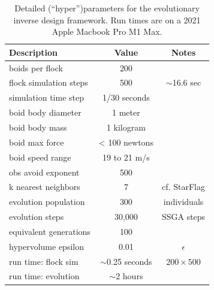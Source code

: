 \documentclass[letterpaper]{article}
\begin{document}
\begin{table}[t]
\centering
\begin{tabular}{ | l | c | c | }
    \hline
    \textbf{Description} & \textbf{Value} & \textbf{Notes} \\
    \hline
    boids per flock & 200 &  \\
    flock simulation steps & 500 & $\sim$16.6 sec \\
    simulation time step & 1/30 seconds & \\
    \hline
    boid body diameter & 1 meter & \\
    boid body mass & 1 kilogram & \\
    boid max force & < 100 newtons & \\
    boid speed range & 19 to 21 m/s & \\
    obs avoid exponent & 500 & \\
    k nearest neighbors & 7 & cf. StarFlag \\
    \hline
    evolution population & 300 & individuals \\
    evolution steps & 30,000 &  SSGA steps \\
    equivalent generations & 100 & \\
    hypervolume epsilon & 0.01 & $\epsilon$ \\
    \hline
    run time: flock sim & $\sim$0.25 seconds & $200{\times}500$ \\
    run time: evolution & $\sim$2 hours & \\
    \hline
\end{tabular}
\caption{Detailed (``hyper'')parameters for the evolutionary inverse design framework. Run times are on a 2021 Apple Macbook Pro M1 Max.}
\label{table:HyperParameters}
\end{table}
\end{document}
